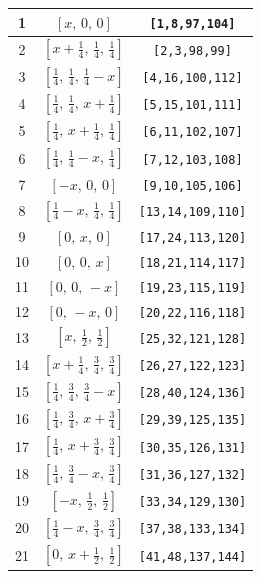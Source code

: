 \documentclass[fleqn,8pt]{jsarticle}
\begin{document}
\begin{longtable}{ccc}
1 & $\left[ x,\, 0,\, 0 \right]$ & {\tt [1,8,97,104]} \\ \hline
2 & $\left[ x + \frac{1}{4},\, \frac{1}{4},\, \frac{1}{4} \right]$ & {\tt [2,3,98,99]} \\ \hline
3 & $\left[ \frac{1}{4},\, \frac{1}{4},\, \frac{1}{4} - x \right]$ & {\tt [4,16,100,112]} \\ \hline
4 & $\left[ \frac{1}{4},\, \frac{1}{4},\, x + \frac{1}{4} \right]$ & {\tt [5,15,101,111]} \\ \hline
5 & $\left[ \frac{1}{4},\, x + \frac{1}{4},\, \frac{1}{4} \right]$ & {\tt [6,11,102,107]} \\ \hline
6 & $\left[ \frac{1}{4},\, \frac{1}{4} - x,\, \frac{1}{4} \right]$ & {\tt [7,12,103,108]} \\ \hline
7 & $\left[ - x,\, 0,\, 0 \right]$ & {\tt [9,10,105,106]} \\ \hline
8 & $\left[ \frac{1}{4} - x,\, \frac{1}{4},\, \frac{1}{4} \right]$ & {\tt [13,14,109,110]} \\ \hline
9 & $\left[ 0,\, x,\, 0 \right]$ & {\tt [17,24,113,120]} \\ \hline
10 & $\left[ 0,\, 0,\, x \right]$ & {\tt [18,21,114,117]} \\ \hline
11 & $\left[ 0,\, 0,\, - x \right]$ & {\tt [19,23,115,119]} \\ \hline
12 & $\left[ 0,\, - x,\, 0 \right]$ & {\tt [20,22,116,118]} \\ \hline
13 & $\left[ x,\, \frac{1}{2},\, \frac{1}{2} \right]$ & {\tt [25,32,121,128]} \\ \hline
14 & $\left[ x + \frac{1}{4},\, \frac{3}{4},\, \frac{3}{4} \right]$ & {\tt [26,27,122,123]} \\ \hline
15 & $\left[ \frac{1}{4},\, \frac{3}{4},\, \frac{3}{4} - x \right]$ & {\tt [28,40,124,136]} \\ \hline
16 & $\left[ \frac{1}{4},\, \frac{3}{4},\, x + \frac{3}{4} \right]$ & {\tt [29,39,125,135]} \\ \hline
17 & $\left[ \frac{1}{4},\, x + \frac{3}{4},\, \frac{3}{4} \right]$ & {\tt [30,35,126,131]} \\ \hline
18 & $\left[ \frac{1}{4},\, \frac{3}{4} - x,\, \frac{3}{4} \right]$ & {\tt [31,36,127,132]} \\ \hline
19 & $\left[ - x,\, \frac{1}{2},\, \frac{1}{2} \right]$ & {\tt [33,34,129,130]} \\ \hline
20 & $\left[ \frac{1}{4} - x,\, \frac{3}{4},\, \frac{3}{4} \right]$ & {\tt [37,38,133,134]} \\ \hline
21 & $\left[ 0,\, x + \frac{1}{2},\, \frac{1}{2} \right]$ & {\tt [41,48,137,144]} \\ \hline

\end{longtable}
\end{document}

